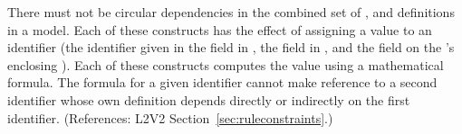 There must not be circular dependencies in the combined set of
\InitialAssignment, \AssignmentRule and \KineticLaw definitions in a model.
Each of these constructs has the effect of assigning a value to an
identifier (\ie the identifier given in the field  in
\InitialAssignment, the field  in \AssignmentRule, and the
field  on the \KineticLaw's enclosing \Reaction).  Each of these
constructs computes the value using a mathematical formula.  The formula
for a given identifier cannot make reference to a second identifier whose
own definition depends directly or indirectly on the first identifier.
(References: L2V2 Section~\ref{sec:ruleconstraints}.)
